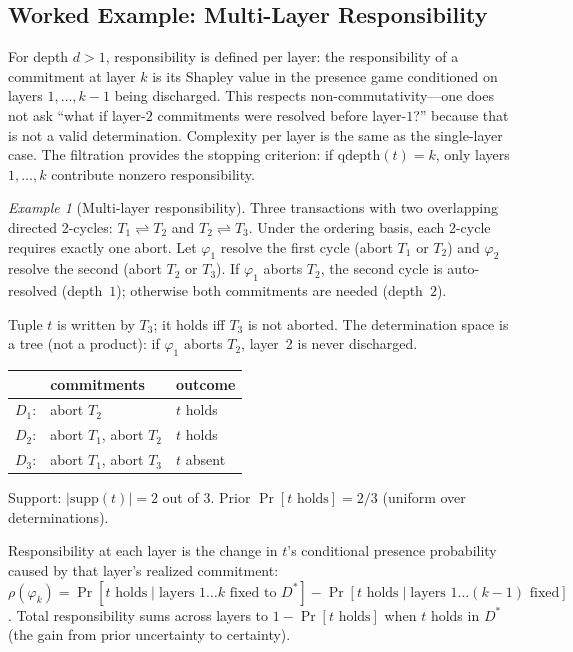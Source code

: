 \documentclass[acmsmall,review,anonymous]{acmart}
\theoremstyle{remark}
\newtheorem{example}{Example}
\numberwithin{definition}{section}
\numberwithin{theorem}{section}
\numberwithin{lemma}{section}
\numberwithin{corollary}{section}
\numberwithin{remark}{section}
\numberwithin{example}{section}
\numberwithin{observation}{section}
\numberwithin{assumption}{section}
\begin{document}
\subsection{Worked Example: Multi-Layer Responsibility}

For depth $d > 1$, responsibility is defined per layer: the
responsibility of a commitment at layer $k$ is its Shapley value in the
presence game conditioned on layers $1, \ldots, k{-}1$ being discharged.
This respects non-commutativity---one does not ask ``what if layer-$2$
commitments were resolved before layer-$1$?'' because that is not a
valid determination.
Complexity per layer is the same as the single-layer case.
The filtration provides the stopping criterion: if
$\mathrm{qdepth}(t) = k$, only layers $1, \ldots, k$ contribute
nonzero responsibility.

\begin{example}[Multi-layer responsibility]
  \label{ex:multi-layer-resp}
  Three transactions with two overlapping directed 2-cycles:
  $T_1 \rightleftharpoons T_2$ and $T_2 \rightleftharpoons T_3$.
  Under the ordering basis, each 2-cycle requires exactly one abort.
  Let $\varphi_1$ resolve the first cycle (abort $T_1$ or $T_2$) and
  $\varphi_2$ resolve the second (abort $T_2$ or $T_3$).
  If $\varphi_1$ aborts $T_2$, the second cycle is auto-resolved
  (depth~$1$); otherwise both commitments are needed (depth~$2$).

  Tuple $t$ is written by $T_3$; it holds iff $T_3$ is not aborted.
  The determination space is a tree (not a product): if $\varphi_1$
  aborts $T_2$, layer~2 is never discharged.
  \begin{center}\small
  \begin{tabular}{lll}
    & commitments & outcome \\
    \hline
    $D_1$: & abort $T_2$ & $t$ holds \\
    $D_2$: & abort $T_1$,\; abort $T_2$ & $t$ holds \\
    $D_3$: & abort $T_1$,\; abort $T_3$ & $t$ absent
  \end{tabular}
  \end{center}
  Support: $|\mathrm{supp}(t)| = 2$ out of $3$.
  Prior $\Pr[t \text{ holds}] = 2/3$ (uniform over determinations).

  Responsibility at each layer is the change in $t$'s conditional
  presence probability caused by that layer's realized commitment:
  $\rho(\varphi_k) = \Pr[t \text{ holds} \mid \text{layers } 1{\ldots}k
  \text{ fixed to } D^*] - \Pr[t \text{ holds} \mid \text{layers }
  1{\ldots}(k{-}1) \text{ fixed}]$.
  Total responsibility sums across layers to $1 - \Pr[t \text{ holds}]$
  when $t$ holds in $D^*$ (the gain from prior uncertainty to certainty).


\end{example}
\end{document}
